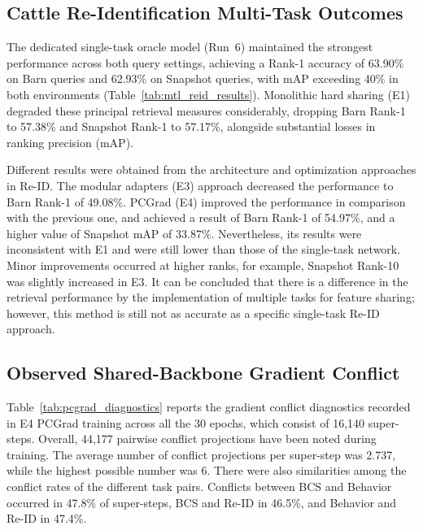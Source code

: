 

\subsection{Cattle Re-Identification Multi-Task Outcomes}

The dedicated single-task oracle model (Run~6) maintained the strongest performance across both query settings, achieving a Rank-1 accuracy of 63.90\% on Barn queries and 62.93\% on Snapshot queries, with mAP exceeding 40\% in both environments (Table~\ref{tab:mtl_reid_results}). Monolithic hard sharing (E1) degraded these principal retrieval measures considerably, dropping Barn Rank-1 to 57.38\% and Snapshot Rank-1 to 57.17\%, alongside substantial losses in ranking precision ($\mathrm{mAP}$).



Different results were obtained from the architecture and optimization approaches in Re-ID. The modular adapters (E3) approach decreased the performance to Barn Rank-1 of 49.08\%. PCGrad (E4) improved the performance in comparison with the previous one, and achieved a result of Barn Rank-1 of 54.97\%, and a higher value of Snapshot mAP of 33.87\%. Nevertheless, its results were inconsistent with E1 and were still lower than those of the single-task network. Minor improvements occurred at higher ranks, for example, Snapshot Rank-10 was slightly increased in E3. It can be concluded that there is a difference in the retrieval performance by the implementation of multiple tasks for feature sharing; however, this method is still not as accurate as a specific single-task Re-ID approach.

\subsection{Observed Shared-Backbone Gradient Conflict}

Table~\ref{tab:pcgrad_diagnostics} reports the gradient conflict diagnostics recorded in E4 PCGrad training across all the 30 epochs, which consist of 16,140 super-steps. Overall, 44,177 pairwise conflict projections have been noted during training. The average number of conflict projections per super-step was 2.737, while the highest possible number was 6. There were also similarities among the conflict rates of the different task pairs. Conflicts between BCS and Behavior occurred in 47.8\% of super-steps, BCS and Re-ID in 46.5\%, and Behavior and Re-ID in 47.4\%.

